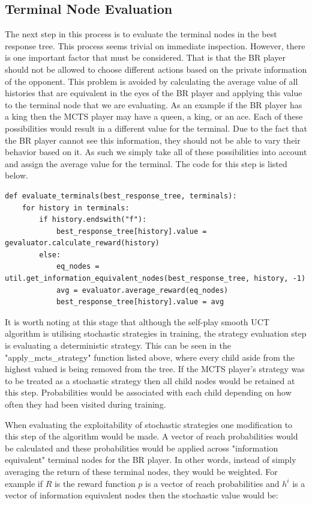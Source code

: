 \subsection{Terminal Node Evaluation}\label{subsec:terminalNodeEvaluation}
The next step in this process is to evaluate the terminal nodes in the best response tree.
This process seems trivial on immediate inspection.
However, there is one important factor that must be considered.
That is that the BR player should not be allowed to choose different actions based on the
private information of the opponent.
This problem is avoided by calculating the average value of all histories that are equivalent in
the eyes of the BR player and applying this value to the terminal node that we are evaluating.
As an example if the BR player has a king then the MCTS player may have a queen, a king, or an ace.
Each of these possibilities would result in a different value for the terminal.
Due to the fact that the BR player cannot see this information, they should not be able to vary
their behavior based on it.
As such we simply take all of these possibilities into account and assign the average value for
the terminal.
The code for this step is listed below.

\begin{lstlisting}[style=Python]
def evaluate_terminals(best_response_tree, terminals):
    for history in terminals:
        if history.endswith("f"):
            best_response_tree[history].value = gevaluator.calculate_reward(history)
        else:
            eq_nodes = util.get_information_equivalent_nodes(best_response_tree, history, -1)
            avg = evaluator.average_reward(eq_nodes)
            best_response_tree[history].value = avg
\end{lstlisting}

It is worth noting at this stage that although the self-play smooth UCT algorithm is utilising
stochastic strategies in training, the strategy evaluation step is evaluating a deterministic strategy.
This can be seen in the "apply\_mcts\_strategy" function listed above, where every
child aside from the highest valued is being removed from the tree.
If the MCTS player's strategy was to be treated as a stochastic strategy then all child
nodes would be retained at this step.
Probabilities would be associated with each child depending on how often they had been visited during training.

When evaluating the exploitability of stochastic strategies one
modification to this step of the algorithm would be made.
A vector of reach probabilities\citep{johanson2011accelerating} would be calculated and these probabilities would
be applied across "information equivalent" terminal nodes for the BR player.
In other words, instead of simply averaging the return of these terminal nodes, they would be weighted.
For example if $R$ is the reward function $p$ is a vector of reach probabilities and
$h^i$ is a vector of information equivalent nodes then the stochastic value would be:

